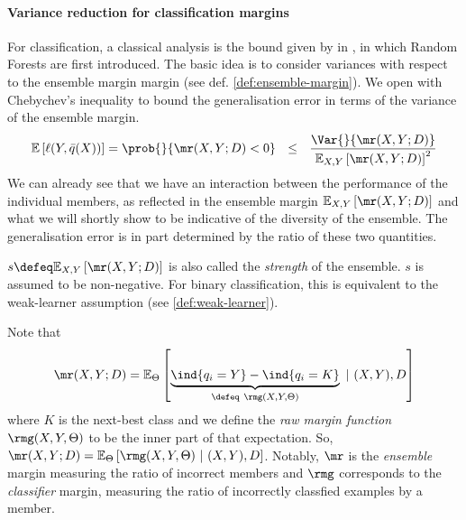 \documentclass[
    a4paper, %
	fontsize=10pt, %
	twoside=false, %
]{kaobook}
\begin{document}
\paragraph{Variance reduction for classification margins} For classification, a classical analysis is the bound given by \citeauthor{breiman_RandomForests_2001} in \cite{breiman_RandomForests_2001}, in which Random Forests are first introduced. The basic idea is to consider variances with respect to the ensemble margin margin (see def. \ref{def:ensemble-margin}).
We open with Chebychev's inequality to bound the generalisation error in terms of the variance of the ensemble margin.
$$
\mathbb{E}\left[ \ell(Y, \bar{q}(X)) \right]  = \prob{}{\mr(X, Y; D) < 0 }  ~ ~ \leq ~ ~ \frac{\Var{}{\mr(X, Y; D)  }}{\mathbb{E}_{X,Y}\left[ \mr(X, Y; D)  \right]^2}
$$
We can already see that we have an interaction between the performance of the individual members, as reflected in the ensemble margin $\mathbb{E}_{X,Y}\left[ \mr(X, Y; D)  \right]$ and what we will shortly show to be indicative of the diversity of the ensemble. The generalisation error is in part determined by the ratio of these two quantities.

$s \defeq \mathbb{E}_{X,Y}\left[ \mr(X, Y; D)  \right]$ is also called the \textit{strength} of the ensemble.
$s$ is assumed to be non-negative. For binary classification, this is equivalent 
to the weak-learner assumption (see \ref{def:weak-learner}).

Note that
$$
\mr(X, Y;D) = \mathbb{E}_{\Theta}\left[ 
\underbrace{
\ind{q_{i}=Y} - \ind{q_{i}=K} 
}_{
\defeq ~\rmg(X, Y, \Theta) 
}
~|~(X,Y), D \right] 
$$
where $K$ is the next-best class and we define the \textit{raw margin function} $\rmg(X, Y, \Theta)$ to be the inner part of that expectation. So, 
$\mr(X, Y;D) = \mathbb{E}_{\Theta}\left[ 
\rmg(X, Y, \Theta) 
~|~(X,Y), D \right]$. Notably, $\mr$ is the \textit{ensemble} margin measuring the ratio of incorrect members and $\rmg$ corresponds to the \textit{classifier} margin, measuring the ratio of incorrectly classfied examples by a member.
\end{document}
